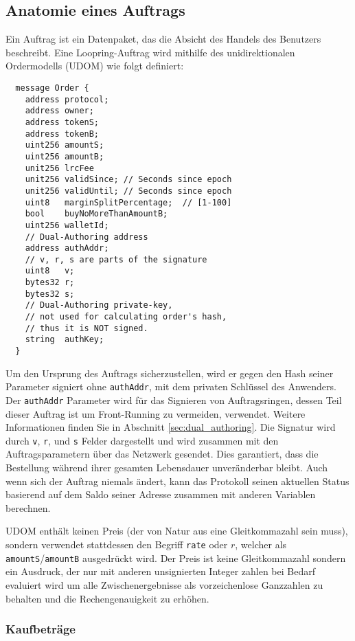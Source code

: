 \documentclass[UTF8,nofonts]{article}
\begin{document}
\begin{multicols}{2}
\subsection{Anatomie eines Auftrags\label{anatomy}}
Ein Auftrag ist ein Datenpaket, das die Absicht des Handels des Benutzers beschreibt. Eine Loopring-Auftrag wird mithilfe des unidirektionalen Ordermodells (UDOM) wie folgt definiert:

\begin{verbatim}
  message Order {
    address protocol;
    address owner;
    address tokenS;
    address tokenB;
    uint256 amountS;
    uint256 amountB;
    unit256 lrcFee
    unit256 validSince; // Seconds since epoch
    unit256 validUntil; // Seconds since epoch
    uint8   marginSplitPercentage;  // [1-100]
    bool    buyNoMoreThanAmountB;
    uint256 walletId;
    // Dual-Authoring address
    address authAddr;
   	// v, r, s are parts of the signature
    uint8   v;       
    bytes32 r;
    bytes32 s;
    // Dual-Authoring private-key,
    // not used for calculating order's hash,
    // thus it is NOT signed.
    string  authKey;          
  }
\end{verbatim}

Um den Ursprung des Auftrags sicherzustellen, wird er gegen den Hash seiner Parameter signiert ohne \verb|authAddr|, mit dem privaten Schlüssel des Anwenders. Der \verb|authAddr| Parameter wird für das Signieren von Auftragsringen, dessen Teil dieser Auftrag ist um Front-Running zu vermeiden, verwendet. Weitere Informationen finden Sie in Abschnitt \ref{sec:dual_authoring}. Die Signatur wird durch \verb|v|, \verb|r|, und \verb|s| Felder dargestellt und wird zusammen mit den Auftragsparametern über das Netzwerk gesendet. Dies garantiert, dass die Bestellung während ihrer gesamten Lebensdauer unveränderbar bleibt. Auch wenn sich der Auftrag niemals ändert, kann das Protokoll seinen aktuellen Status basierend auf dem Saldo seiner Adresse zusammen mit anderen Variablen berechnen.

UDOM enthält keinen Preis (der von Natur aus eine Gleitkommazahl sein muss), sondern verwendet stattdessen den Begriff \verb|rate| oder $r$, welcher als \verb|amountS|/\verb|amountB| ausgedrückt wird. Der Preis ist keine Gleitkommazahl sondern ein Ausdruck, der nur mit anderen unsignierten Integer zahlen bei Bedarf evaluiert wird um alle Zwischenergebnisse als vorzeichenlose Ganzzahlen zu behalten und die Rechengenauigkeit zu erhöhen.

\subsubsection{Kaufbeträge}


\end{multicols}
\end{document}
